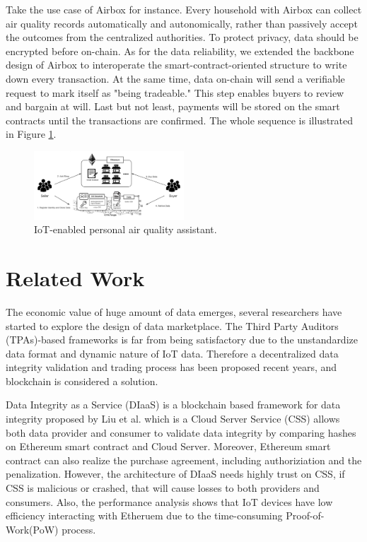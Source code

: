 \documentclass[journal,a4paper]{IEEEtran}
\begin{document}
Take the use case of Airbox\cite{LASS} for instance. Every household with Airbox can collect air quality records automatically and autonomically, rather than passively accept the outcomes from the centralized authorities. To protect privacy, data should be encrypted before on-chain. As for the data reliability, we extended the backbone design of Airbox to interoperate the smart-contract-oriented structure to write down every transaction. At the same time, data on-chain will send a verifiable request to mark itself as "being tradeable." This step enables buyers to review and bargain at will. Last but not least, payments will be stored on the smart contracts until the transactions are confirmed. The whole sequence is illustrated in Figure \ref{fig:airbox}.

\begin{figure}[h]
        \centering
	\includegraphics[width=0.5\textwidth]{airbox}
	\caption{IoT-enabled personal air quality assistant.}
	\label{fig:airbox}
\end{figure}

\section{Related Work}
The economic value of huge amount of data emerges, several researchers have started to explore the design of data marketplace. The Third Party Auditors (TPAs)-based frameworks is far from being satisfactory due to the unstandardize data format and dynamic nature of IoT data. Therefore a decentralized data integrity validation and trading process has been proposed recent years, and blockchain is considered a solution.

Data Integrity as a Service (DIaaS) is a blockchain based framework for data integrity proposed by Liu et al.\cite{DIaas} which is a Cloud Server Service (CSS) allows both data provider and consumer to validate data integrity by comparing hashes on Ethereum smart contract and Cloud Server. Moreover, Ethereum smart contract can also realize the purchase agreement, including authoriziation and the penalization. However, the architecture of DIaaS needs highly trust on CSS, if CSS is malicious or crashed, that will cause losses to both providers and consumers. Also, the performance analysis shows that IoT devices have low efficiency interacting with Etheruem due to the time-consuming Proof-of-Work(PoW) process.
\end{document}
